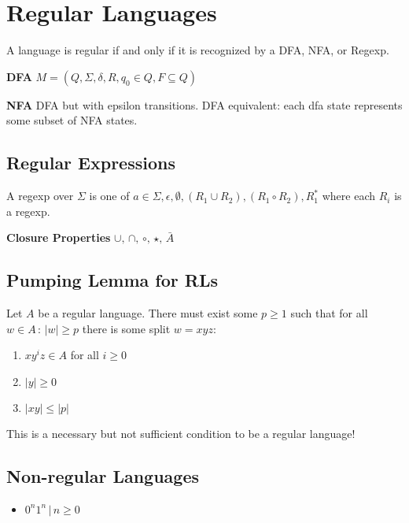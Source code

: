 

\section{Regular Languages}
\label{regularlanguages}

A language is regular if and only if it is recognized by a DFA, NFA, or Regexp.

\textbf{DFA} $M = (Q, \Sigma, \delta, R, q_0 \in Q, F \subseteq Q)$

\textbf{NFA} DFA but with epsilon transitions. DFA equivalent: each dfa state represents some subset of NFA states.

\subsection{Regular Expressions}
\label{regularexpressions}

A regexp over $\Sigma$ is one of $a\in \Sigma,\epsilon,\emptyset,(R_1\cup R_2),(R_1\circ R_2),R_1^* $ where each $R_i$ is a regexp.

\textbf{Closure Properties} $\cup,\,\cap,\, \circ,\, \star,\, \bar{A}$

\subsection{Pumping Lemma for RLs}
\label{pumpinglemmaforrls}

Let $A$ be a regular language. There must exist some $p \geq 1 $ such that for all $w\in A\, :\, |w| \geq p$ there is some split $w = xyz$:

\begin{enumerate}
\item $xy^iz \in A$ for all $i \geq 0$

\item $|y| \geq 0$

\item $|xy| \leq |p|$

\end{enumerate}

This is a necessary but not sufficient condition to be a regular language!

\subsection{Non-{}regular Languages}
\label{non-regularlanguages}

\begin{itemize}
\item $0^n1^n\, |\, n\geq 0 $

\end{itemize}

